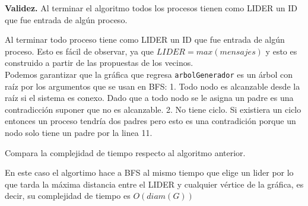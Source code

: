 \textbf{Validez.} Al terminar el algoritmo todos los procesos tienen como LIDER un ID que fue entrada de algún proceso.

Al terminar todo proceso tiene como LIDER un ID que fue entrada de algún proceso. Esto es fácil de observar, ya que $LIDER=max(mensajes)$ y esto es construido a partir de las propuestas de los vecinos.\\


Podemos garantizar que la gráfica que regresa {\tt arbolGenerador} es un árbol con raíz por los argumentos que se usan en BFS:
1. Todo nodo es alcanzable desde la raíz si el sistema es conexo. Dado que a todo nodo se le asigna un padre es una contradicción suponer que no es alcanzable.
2. No tiene ciclo. Si existiera un ciclo entonces un proceso tendría dos padres pero esto es una contradición porque un nodo solo tiene un padre por la linea 11.


Compara la complejidad de tiempo respecto al algoritmo anterior.

En este caso el algortimo hace a BFS al mismo tiempo que elige un lider por lo que tarda la máxima distancia entre el LIDER y cualquier vértice de la gráfica, es decir, su complejidad de tiempo es $O(diam(G))$